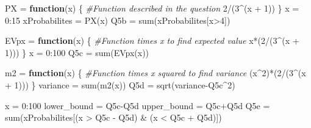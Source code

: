 \documentclass[
]{article}
\newenvironment{Shaded}{\begin{snugshade}}{\end{snugshade}}
\newcommand{\CommentTok}[1]{\textcolor[rgb]{0.56,0.35,0.01}{\textit{#1}}}
\newcommand{\ControlFlowTok}[1]{\textcolor[rgb]{0.13,0.29,0.53}{\textbf{#1}}}
\newcommand{\DecValTok}[1]{\textcolor[rgb]{0.00,0.00,0.81}{#1}}
\newcommand{\FunctionTok}[1]{\textcolor[rgb]{0.00,0.00,0.00}{#1}}
\newcommand{\NormalTok}[1]{#1}
\newcommand{\OtherTok}[1]{\textcolor[rgb]{0.56,0.35,0.01}{#1}}
\newcommand{\SpecialCharTok}[1]{\textcolor[rgb]{0.00,0.00,0.00}{#1}}
\begin{document}
\begin{Shaded}
\begin{Highlighting}[]
\NormalTok{PX }\OtherTok{=} \ControlFlowTok{function}\NormalTok{(x) \{ }\CommentTok{\#Function described in the question}
  \DecValTok{2}\SpecialCharTok{/}\NormalTok{(}\DecValTok{3}\SpecialCharTok{\^{}}\NormalTok{(x }\SpecialCharTok{+} \DecValTok{1}\NormalTok{))}
\NormalTok{\}}
\NormalTok{x }\OtherTok{=} \DecValTok{0}\SpecialCharTok{:}\DecValTok{15}
\NormalTok{xProbabilites }\OtherTok{=} \FunctionTok{PX}\NormalTok{(x)}
\NormalTok{Q5b }\OtherTok{=} \FunctionTok{sum}\NormalTok{(xProbabilites[x}\SpecialCharTok{\textgreater{}}\DecValTok{4}\NormalTok{])}

\NormalTok{EVpx }\OtherTok{=} \ControlFlowTok{function}\NormalTok{(x) \{ }\CommentTok{\#Function times x to find expected value}
\NormalTok{  x}\SpecialCharTok{*}\NormalTok{(}\DecValTok{2}\SpecialCharTok{/}\NormalTok{(}\DecValTok{3}\SpecialCharTok{\^{}}\NormalTok{(x }\SpecialCharTok{+} \DecValTok{1}\NormalTok{)))}
\NormalTok{\}}
\NormalTok{x }\OtherTok{=} \DecValTok{0}\SpecialCharTok{:}\DecValTok{100}
\NormalTok{Q5c }\OtherTok{=} \FunctionTok{sum}\NormalTok{(}\FunctionTok{EVpx}\NormalTok{(x))}

\NormalTok{m2 }\OtherTok{=} \ControlFlowTok{function}\NormalTok{(x) \{ }\CommentTok{\#Function times x squared to find variance}
\NormalTok{  (x}\SpecialCharTok{\^{}}\DecValTok{2}\NormalTok{)}\SpecialCharTok{*}\NormalTok{(}\DecValTok{2}\SpecialCharTok{/}\NormalTok{(}\DecValTok{3}\SpecialCharTok{\^{}}\NormalTok{(x }\SpecialCharTok{+} \DecValTok{1}\NormalTok{)))}
\NormalTok{\}}
\NormalTok{variance }\OtherTok{=} \FunctionTok{sum}\NormalTok{(}\FunctionTok{m2}\NormalTok{(x))}
\NormalTok{Q5d }\OtherTok{=} \FunctionTok{sqrt}\NormalTok{(variance}\SpecialCharTok{{-}}\NormalTok{Q5c}\SpecialCharTok{\^{}}\DecValTok{2}\NormalTok{)}

\NormalTok{x }\OtherTok{=} \DecValTok{0}\SpecialCharTok{:}\DecValTok{100}
\NormalTok{lower\_bound }\OtherTok{=}\NormalTok{ Q5c}\SpecialCharTok{{-}}\NormalTok{Q5d}
\NormalTok{upper\_bound }\OtherTok{=}\NormalTok{ Q5c}\SpecialCharTok{+}\NormalTok{Q5d}
\NormalTok{Q5e }\OtherTok{=}  \FunctionTok{sum}\NormalTok{(xProbabilites[(x }\SpecialCharTok{\textgreater{}}\NormalTok{ Q5c }\SpecialCharTok{{-}}\NormalTok{ Q5d) }\SpecialCharTok{\&}\NormalTok{ (x }\SpecialCharTok{\textless{}}\NormalTok{ Q5c }\SpecialCharTok{+}\NormalTok{ Q5d)])}
\end{Highlighting}
\end{Shaded}
\end{document}
